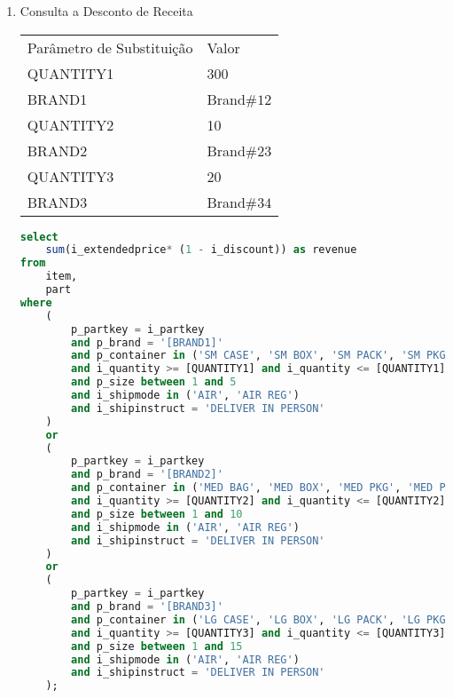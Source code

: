 \begin{enumerate}
\item Consulta a Desconto de Receita

\begin{tabular}{ll}
	Parâmetro de Substituição & Valor\\
	QUANTITY1 & 300\\
	BRAND1 & Brand$\#12$ \\
	QUANTITY2 & 10 \\
	BRAND2 & Brand$\#23$ \\
	QUANTITY3 & 20 \\
	BRAND3 & Brand$\#34$ \\
\end{tabular}

	\begin{lstlisting}[language=SQL]
select
    sum(i_extendedprice* (1 - i_discount)) as revenue
from
    item,
    part
where
    (
        p_partkey = i_partkey
        and p_brand = '[BRAND1]'
        and p_container in ('SM CASE', 'SM BOX', 'SM PACK', 'SM PKG')
        and i_quantity >= [QUANTITY1] and i_quantity <= [QUANTITY1] + 10
        and p_size between 1 and 5
        and i_shipmode in ('AIR', 'AIR REG')
        and i_shipinstruct = 'DELIVER IN PERSON'
    )
    or
    (
        p_partkey = i_partkey
        and p_brand = '[BRAND2]'
        and p_container in ('MED BAG', 'MED BOX', 'MED PKG', 'MED PACK')
        and i_quantity >= [QUANTITY2] and i_quantity <= [QUANTITY2] + 10
        and p_size between 1 and 10
        and i_shipmode in ('AIR', 'AIR REG')
        and i_shipinstruct = 'DELIVER IN PERSON'
    )
    or
    (
        p_partkey = i_partkey
        and p_brand = '[BRAND3]'
        and p_container in ('LG CASE', 'LG BOX', 'LG PACK', 'LG PKG')
        and i_quantity >= [QUANTITY3] and i_quantity <= [QUANTITY3] + 10
        and p_size between 1 and 15
        and i_shipmode in ('AIR', 'AIR REG')
        and i_shipinstruct = 'DELIVER IN PERSON'
    );
	\end{lstlisting}




\end{enumerate}
